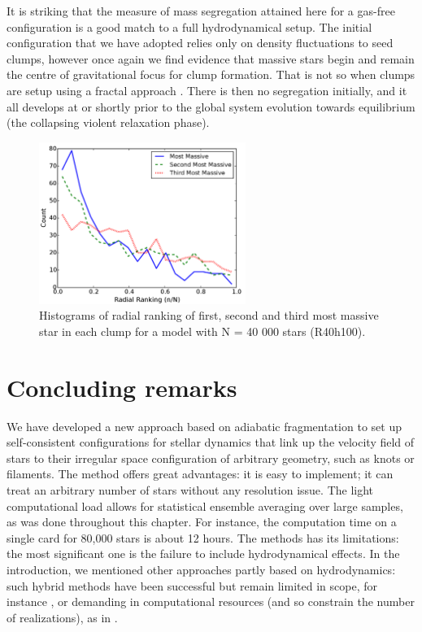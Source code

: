 It is striking that the measure of mass segregation attained here for a gas-free configuration is a good match to a full hydrodynamical setup. The initial configuration that we have adopted relies only on density fluctuations to seed clumps, however once again we find evidence that massive stars begin and remain the centre of gravitational focus for clump formation. That is not so when clumps are setup using a fractal approach \citep{Goodwin2004,Allison2009}. There is then no segregation initially, and it all develops at or shortly prior to the global system evolution towards equilibrium (the collapsing violent relaxation phase). 


\begin{figure}
\begin{center}
\includegraphics[width=0.6\textwidth]{Figures/2_ClumpSeg}
\caption[Radial ranking of first, second and third most massive stars in each clump]{Histograms of radial ranking of first, second and third most massive star in each clump for a model with N = 40 000 stars (R40h100).}
\label{Fig:2_ClumpSeg}
\end{center}
\end{figure}







\section{Concluding remarks}
\label{Sec:2_conclusion}

We have developed a new approach based on adiabatic fragmentation to set up self-consistent configurations for stellar dynamics that link up the velocity field of stars to their irregular space configuration of arbitrary geometry, such as knots or filaments. The method offers great advantages: it is easy to implement; it can treat an arbitrary number of stars without any resolution issue. The light computational load allows for statistical ensemble averaging over large samples, as was done throughout this chapter. For instance, the computation time on a single card for 80,000 stars is about 12 hours. The methods has its limitations: the most significant one is the failure to include hydrodynamical effects. In the introduction, we mentioned other approaches partly based on hydrodynamics: such hybrid methods have been successful but remain limited in scope, for instance \cite{Moeckel2012}, or demanding in computational resources (and so constrain the number of realizations), as in \cite{Fujii2016}. 

